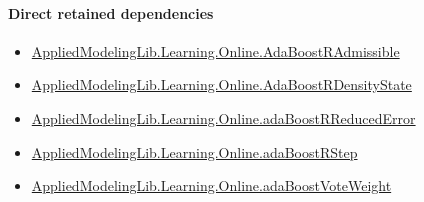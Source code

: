 \documentclass[10pt]{article}
\begin{document}
\paragraph{Direct retained dependencies}
\begin{itemize}\raggedright
\item \hyperlink{library-prerequisite-629f39db1994b79f}{Applied\allowbreak{}Modeling\allowbreak{}Lib.\allowbreak{}Learning.\allowbreak{}Online.\allowbreak{}Ada\allowbreak{}Boost\allowbreak{}R\allowbreak{}Admissible}
\item \hyperlink{library-prerequisite-05718297c0c800e4}{Applied\allowbreak{}Modeling\allowbreak{}Lib.\allowbreak{}Learning.\allowbreak{}Online.\allowbreak{}Ada\allowbreak{}Boost\allowbreak{}R\allowbreak{}Density\allowbreak{}State}
\item \hyperlink{governing-declaration-fe36bd27b8697a7b}{Applied\allowbreak{}Modeling\allowbreak{}Lib.\allowbreak{}Learning.\allowbreak{}Online.\allowbreak{}ada\allowbreak{}Boost\allowbreak{}R\allowbreak{}Reduced\allowbreak{}Error}
\item \hyperlink{governing-declaration-07709be11ef699d2}{Applied\allowbreak{}Modeling\allowbreak{}Lib.\allowbreak{}Learning.\allowbreak{}Online.\allowbreak{}ada\allowbreak{}Boost\allowbreak{}R\allowbreak{}Step}
\item \hyperlink{governing-declaration-4fae1388d9e0485c}{Applied\allowbreak{}Modeling\allowbreak{}Lib.\allowbreak{}Learning.\allowbreak{}Online.\allowbreak{}ada\allowbreak{}Boost\allowbreak{}Vote\allowbreak{}Weight}
\end{itemize}
\end{document}
